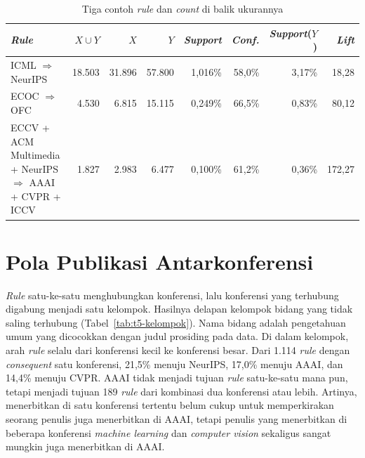 \begin{table}[!htb]
\caption{Tiga contoh \textit{rule} dan \textit{count} di balik ukurannya}
\label{tab:t5-contoh}
\footnotesize
\begin{tabularx}{\textwidth}{@{}>{\raggedright\arraybackslash}Xrrrrrrr@{}}
\toprule
\textbf{\textit{Rule}} & \textbf{$X \cup Y$} & \textbf{$X$} & \textbf{$Y$} & \textbf{\textit{Support}} & \textbf{\textit{Conf.}} & \textbf{\textit{Support}($Y$)} & \textbf{\textit{Lift}} \\
\midrule
ICML $\Rightarrow$ NeurIPS & 18.503 & 31.896 & 57.800 & 1,016\% & 58,0\% & 3,17\% & 18,28 \\
ECOC $\Rightarrow$ OFC & 4.530 & 6.815 & 15.115 & 0,249\% & 66,5\% & 0,83\% & 80,12 \\
ECCV + ACM Multimedia + NeurIPS $\Rightarrow$ AAAI + CVPR + ICCV & 1.827 & 2.983 & 6.477 & 0,100\% & 61,2\% & 0,36\% & 172,27 \\
\bottomrule
\end{tabularx}
\end{table}

\section{Pola Publikasi Antarkonferensi}
\label{sec:hasil-t5-pola}
\textit{Rule} satu-ke-satu menghubungkan konferensi, lalu konferensi yang terhubung digabung menjadi satu kelompok. Hasilnya delapan kelompok bidang yang tidak saling terhubung (Tabel~\ref{tab:t5-kelompok}). Nama bidang adalah pengetahuan umum yang dicocokkan dengan judul prosiding pada data. Di dalam kelompok, arah \textit{rule} selalu dari konferensi kecil ke konferensi besar. Dari 1.114 \textit{rule} dengan \textit{consequent} satu konferensi, 21,5\% menuju NeurIPS, 17,0\% menuju AAAI, dan 14,4\% menuju CVPR. AAAI tidak menjadi tujuan \textit{rule} satu-ke-satu mana pun, tetapi menjadi tujuan 189 \textit{rule} dari kombinasi dua konferensi atau lebih. Artinya, menerbitkan di satu konferensi tertentu belum cukup untuk memperkirakan seorang penulis juga menerbitkan di AAAI, tetapi penulis yang menerbitkan di beberapa konferensi \textit{machine learning} dan \textit{computer vision} sekaligus sangat mungkin juga menerbitkan di AAAI.

